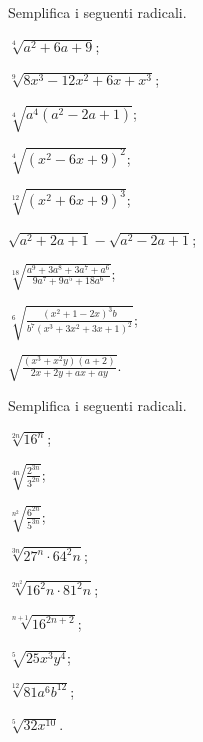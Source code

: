 \begin{esercizio}[\Ast]
 \label{ese:2.31}
Semplifica i seguenti radicali.
 \begin{multicols}{2}
 \begin{enumeratea}
 \item $\sqrt[4]{a^2+6a+9}$;
 \item $\sqrt[9]{8x^3-12x^2+6x+x^3}$;
 \item $\sqrt[4]{a^4(a^2-2a+1)}$;
 \item $\sqrt[4]{(x^2-6x+9)^2}$;
 \item $\sqrt[12]{(x^2+6x+9)^3}$;
 \item $\sqrt{a^2+2a+1}-\sqrt{a^2-2a+1}$;
 \item $\sqrt[18]{\frac{a^9+3a^8+3a^7+a^6}{9a^7+9a^5+18a^6}}$;
 \item $\sqrt[6]{\frac{(x^2+1-2x)^3b}{b^7\left(x^3+3x^2+3x+1\right)^2}}$;
 \item $\sqrt{\frac{\left(x^3+x^2y\right)(a+2)}{2x+2y+ax+ay}}$.
 \end{enumeratea}
 \end{multicols}
\end{esercizio}

\begin{esercizio}[\Ast]
 \label{ese:2.32}
Semplifica i seguenti radicali.
 \begin{multicols}{3}
 \begin{enumeratea}
 \item $\sqrt[2n]{16^n}$;
 \item $\sqrt[4n]{\frac{2^{3n}}{3^{2n}}}$;
 \item $\sqrt[n^2]{\frac{6^{2n}}{5^{3n}}}$;
 \item $\sqrt[3n]{27^n\cdot 64^2n}$;
 \item $\sqrt[2n^2]{16^2n\cdot 81^2n}$;
 \item $\sqrt[n+1]{16^{2n+2}}$;
 \item $\sqrt[5]{25x^3y^4}$;
 \item $\sqrt[12]{81a^6b^{12}}$;
 \item $\sqrt[5]{32x^{10}}$.
 \end{enumeratea}
 \end{multicols}
\end{esercizio}

